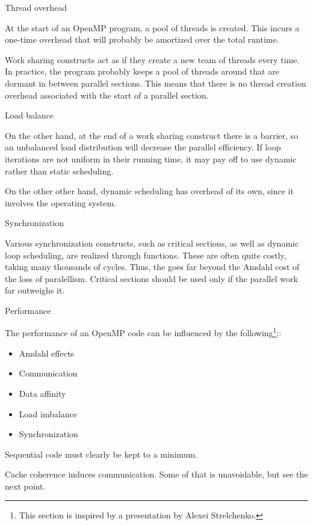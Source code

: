  {Thread overhead}

At the start of an OpenMP program, a pool of threads is created. This
incurs a one-time overhead that will probably be amortized over the
total runtime.

Work sharing constructs act as if they create a new team of threads every time.
In practice, the program probably keeps a pool of threads around that are dormant
in between parallel sections. This means that there is no thread creation overhead
associated with the start of a parallel section.

 {Load balance}

On the other hand, at the end of a work sharing construct there is a barrier,
so an unbalanced load distribution will decrease the parallel efficiency.
If loop iterations are not uniform in their running time, it may pay off
to use dynamic rather than static scheduling.

On the other other hand, dynamic scheduling has overhead of its own,
since it involves the operating system.

 {Synchronization}

Various synchronization constructs, such as critical sections, as well as
dynamic loop scheduling, are realized through 
functions. These are often quite costly, taking many thousands of cycles.
Thus, the  goes far beyond
the Amdahl cost of the loss of paralellism. Critical sections should be used only
if the parallel work far outweighs it.

 {Performance}


The performance of an OpenMP code can be influenced by the following\footnote
{This section is inspired by a presentation by Alexei Strelchenko.}::
\begin{itemize}
\item Amdahl effects
\item Communication
\item Data affinity
\item Load imbalance
\item Synchronization
\end{itemize}

Sequential code must clearly be kept to a minimum.

Cache coherence induces communication. Some of that is unavoidable,
but see the next point.

